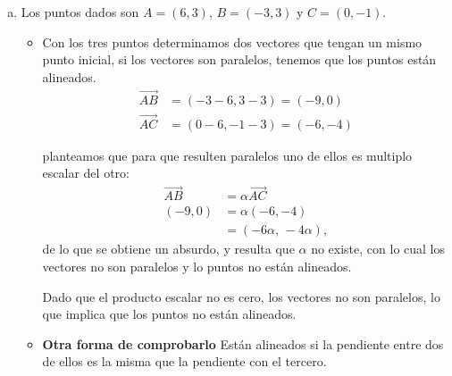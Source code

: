 \documentclass[11pt]{article}
\begin{document}
\begin{enumerate}[\hspace{-5mm} 1) ]
\begin{enumerate}[(a)]
\begin{center}
\end{center}

\item  Los puntos dados son $A = (6,3)$, $B = (-3,3)$ y $C = (0,-1)$. 


\begin{itemize}
    \item Con los tres puntos determinamos dos vectores que tengan un mismo punto inicial, si los vectores son paralelos, tenemos que los puntos están alineados.
\begin{align*}
    \overrightarrow{AB} &= (-3 - 6, 3 - 3) = (-9,0) \\
    \overrightarrow{AC} &=  (0 - 6, -1- 3) = (-6,-4)
\end{align*}

planteamos que para que resulten paralelos uno de ellos es multiplo escalar del otro:
\begin{align*}
    \overrightarrow{AB}  &= \alpha \overrightarrow{AC} \\
    (-9,0) &= \alpha  (-6,-4)\\
    &= (-6\alpha,\, -4 \alpha) , 
\end{align*}
de lo que se obtiene un absurdo, y resulta que $\alpha$ no existe, con lo cual los vectores no son paralelos  y lo puntos no están alineados.

Dado que el producto escalar no es cero, los vectores no son paralelos, lo que implica que los puntos no están alineados.




    \item  {\bf Otra forma de comprobarlo}  Están alineados si la pendiente entre dos de ellos es la misma que la pendiente con el tercero.


\end{itemize}
\end{enumerate}
\end{enumerate}
\end{document}
